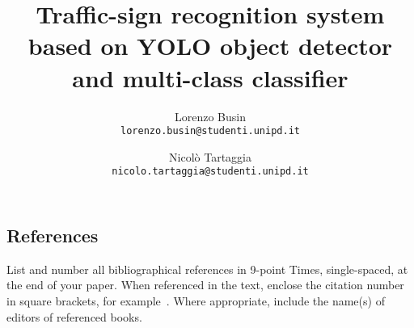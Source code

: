 \documentclass[10pt,twocolumn,letterpaper]{article}
\begin{document}
\title{Traffic-sign recognition system based on YOLO object detector and multi-class classifier}

\author{Lorenzo Busin\\
{\tt\small lorenzo.busin@studenti.unipd.it}
\and
Nicolò Tartaggia\\
{\tt\small nicolo.tartaggia@studenti.unipd.it}
}

\maketitle

\let\clearpage\relax



\subsection{References}

List and number all bibliographical references in 9-point Times,
single-spaced, at the end of your paper. When referenced in the text,
enclose the citation number in square brackets, for
example~\cite{Authors14}.  Where appropriate, include the name(s) of
editors of referenced books.
\end{document}
